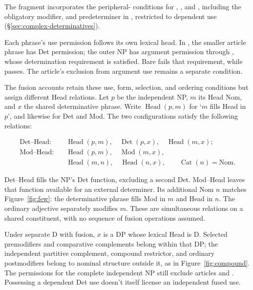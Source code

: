 \documentclass[12pt]{article}
\begin{document}
The fragment incorporates the peripheral- conditions for , , and , including the obligatory modifier, and predeterminer  in , restricted to dependent use (§\ref{sec:complex-determinatives}).

Each phrase's use permission follows its own lexical head. In , the smaller article phrase has Det permission; the outer NP has argument permission through , whose determination requirement is satisfied. Bare  fails that requirement, while  passes. The article's exclusion from argument use remains a separate condition.

The fusion accounts retain these use, form, selection, and ordering conditions but assign different Head relations. Let $p$ be the independent NP, $m$ its Head Nom, and $x$ the shared determinative phrase. Write $\operatorname{Head}(p,m)$ for \enquote*{$m$ fills Head in $p$}, and likewise for Det and Mod. The two configurations satisfy the following relations:

\[
\begin{aligned}
\text{Det--Head:}\quad
 &\operatorname{Head}(p,m),\quad \operatorname{Det}(p,x),\quad \operatorname{Head}(m,x); \\
\text{Mod--Head:}\quad
 &\operatorname{Head}(p,m),\quad \operatorname{Mod}(m,x),\\
 &\operatorname{Head}(m,n),\quad \operatorname{Head}(n,x),\qquad \operatorname{Cat}(n)=\mathrm{Nom}.
\end{aligned}
\]

Det--Head fills the NP's Det function, excluding a second Det. Mod--Head leaves that function available for an external determiner. Its additional Nom $n$ matches Figure~\ref{fig:few}: the determinative phrase fills Mod in $m$ and Head in $n$. The ordinary adjective  separately modifies $m$. These are simultaneous relations on a shared constituent, with no sequence of fusion operations assumed.

Under separate D with fusion, $x$ is a DP whose lexical Head is D. Selected premodifiers and comparative complements belong within that DP; the independent partitive complement, compound restrictor, and ordinary postmodifiers belong to nominal structure outside it, as in Figure~\ref{fig:compound}. The permissions for the complete independent NP still exclude articles and . Possessing a dependent Det use doesn't itself license an independent fused use.
\end{document}
